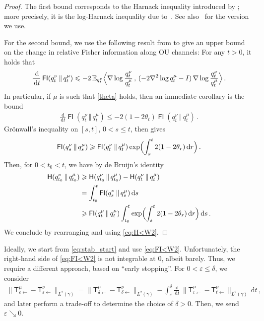 \documentclass[12pt]{article}
\newcommand{\E}{\mathbb{E}}
\newcommand{\1}{\mathds{1}}
\newcommand*{\rd}{\mathrm{d}}
\newcommand*{\dd}{\, \rd}
\newcommand{\eps}{\varepsilon}
\newcommand{\mmid}{\,\Vert\,}
\DeclareMathOperator*{\FI}{\mathsf{FI}}
\renewcommand{\geq}{\geqslant}
\renewcommand{\ge}{\geqslant}
\renewcommand{\leq}{\leqslant}
\renewcommand{\le}{\leqslant}
\newcommand{\KM}{\mathsf T}
\theoremstyle{plain}
\theoremstyle{definition}
\theoremstyle{remark}
\begin{document}
\begin{proof}
The first bound corresponds to the Harnack inequality introduced by \cite{wang1997logarithmic}; more precisely, it is the log-Harnack inequality due to~\citet{BobGenLed01Hyper}. See also~\citet[Corollary 3.11]{altschuler_shifted_2025} for the version we use.

For the second bound, we use the following result from {\citet[Lemma 2]{wibisono2025mixing}} 
to give an upper bound on the change in relative Fisher information along OU channels: For any $t > 0$, it holds that
    \begin{align*}
        \frac{\dd}{\dd t}\FI(q^\nu_t\mmid q^\mu_t) \leq - 2\,\E_{q_t^\nu}\Bigl\langle \nabla \log \frac{q_t^\nu}{q_t^\mu}\,,\,(-2\nabla^2 \log q_t^\mu - I)\,\nabla \log \frac{q_t^\nu}{q_t^\mu} \Bigr\rangle\,.
    \end{align*}
In particular, if $\mu$ is such that \eqref{theta} holds, then an immediate corollary is the bound
\begin{align}\label{eq:andre_corollary}
\frac{\dd}{\dd t} \FI(q_t^\nu\mmid q_t^\mu) \leq -2(1-2\theta_t)\FI(q_t^\nu\mmid q_t^\mu)\,.
\end{align}
Gr\"onwall's inequality on $[s,t]$, $0 < s \leq t$, then gives
\begin{align*}
    {\FI}(q_{s}^\nu\mmid q_{s}^\mu)
    \ge {\FI}(q_t^\nu\mmid q_{t}^\mu) \exp\Bigl(\int_s^t 2(1-2\theta_r)\dd r\Bigr)\,.
\end{align*}
Then, for $0 < t_0 < t$, we have by de Bruijn's identity
\begin{align*}
    {\mathsf H}(q_{t_0}^\nu\mmid q_{t_0}^\mu) &\geq {\mathsf H}(q_{t_0}^\nu\mmid q_{t_0}^\mu) - {\mathsf H}(q_{t}^\nu\mmid q_{t}^\mu) \\
    &=  \int_{t_0}^t {\FI}(q_{s}^\nu\mmid q_{s}^\mu)\dd s \\
    &\ge {\FI}(q_{t}^\nu\mmid q_{t}^\mu) \int_{t_0}^t \exp\Bigl(\int_s^t 2(1-2\theta_r)\dd r\Bigr)\dd s\,.
\end{align*}
We conclude by rearranging and using \eqref{eq:H<W2}.
\end{proof}


Ideally, we start from \eqref{eq:stab_start} and use \eqref{eq:FI<W2}. Unfortunately, the right-hand side of \eqref{eq:FI<W2} is not integrable at $0$, albeit barely. Thus, we require  a different approach, based on ``early stopping''.
For $0 < \varepsilon \le \delta$, we consider
\begin{align*}
    \|\KM^\mu_{\eps\gets} -\KM^\nu_{\eps\gets}\|_{L^2(\gamma)} = \|\KM^\mu_{\delta\gets} - \KM^\nu_{\delta\gets}\|_{L^2(\gamma)} - \int_\eps^\delta \frac{\dd}{\dd t}\, \|\KM^\mu_{t\gets} - \KM^\nu_{t\gets}\|_{L^2(\gamma)} \dd t\,,
\end{align*}
and later perform a trade-off to determine the choice of $\delta > 0$. 
Then, we send $\varepsilon\searrow 0$.
\end{document}
